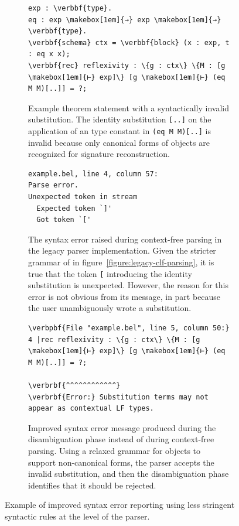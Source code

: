 \begin{figure}[H]
\begin{subfigure}{\linewidth}
\begin{Verbatim}[commandchars=\\\{\}, baselinestretch=1]
exp : \verbbf{type}.
eq : exp \makebox[1em]{→} exp \makebox[1em]{→} \verbbf{type}.
\verbbf{schema} ctx = \verbbf{block} (x : exp, t : eq x x);
\verbbf{rec} reflexivity : \{g : ctx\} \{M : [g \makebox[1em]{⊢} exp]\} [g \makebox[1em]{⊢} (eq M M)[..]] = ?;
\end{Verbatim}
\caption{%
Example \Beluga theorem statement with a syntactically invalid substitution.
The identity substitution \texttt{[..]} on the application of an \LF type constant in \texttt{(eq M M)[..]} is invalid because only canonical forms of \LF objects are recognized for signature reconstruction.
}
\end{subfigure}
\par\bigskip
\begin{subfigure}{\linewidth}
\begin{Verbatim}[baselinestretch=1]
example.bel, line 4, column 57:
Parse error.
Unexpected token in stream
  Expected token `]'
  Got token `['
\end{Verbatim}
\caption{%
The syntax error raised during context-free parsing in the legacy parser implementation.
Given the stricter grammar of  in figure~\ref{figure:legacy-clf-parsing}, it is true that the token \texttt{[} introducing the identity substitution is unexpected.
However, the reason for this error is not obvious from its message, in part because the user unambiguously wrote a substitution.
}
\end{subfigure}
\par\bigskip
\begin{subfigure}{\linewidth}
\begin{Verbatim}[commandchars=\\\{\}, baselinestretch=1]
\verbpbf{File "example.bel", line 5, column 50:}
4 |rec reflexivity : \{g : ctx\} \{M : [g \makebox[1em]{⊢} exp]\} [g \makebox[1em]{⊢} (eq M M)[..]] = ?;
                                                      \verbrbf{^^^^^^^^^^^^}
\verbrbf{Error:} Substitution terms may not appear as contextual LF types.
\end{Verbatim}
\caption{%
Improved syntax error message produced during the disambiguation phase instead of during context-free parsing.
Using a relaxed grammar for \LF objects to support non-canonical forms, the parser accepts the invalid substitution, and then the disambiguation phase identifies that it should be rejected.
}
\end{subfigure}
\caption[Example of improved syntax error reporting]{%
Example of improved syntax error reporting using less stringent syntactic rules at the level of the parser.
}
\label{figure:improved-syntax-error-message}
\end{figure}


